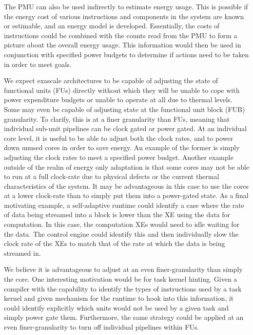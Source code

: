     The PMU can also be used indirectly to estimate energy usage. This is possible if the energy cost of various instructions and components in the system are known or estimable, and an energy model is developed. Essentially, the costs of instructions could be combined with the counts read from the PMU to form a picture about the overall energy usage. This information would then be used in conjunction with specified power budgets to determine if actions need to be taken in order to meet goals.
    

    We expect exascale architectures to be capable of adjusting the state of functional units (FUs) directly without which they will be unable to cope with power expenditure budgets or unable to operate at all due to thermal levels. Some may even be capable of adjusting state at the functional unit block (FUB) granularity. To clarify, this is at a finer granularity than FUs, meaning that individual sub-unit pipelines can be clock gated or power gated. At an individual core level, it is useful to be able to adjust both the clock rates, and to power down unused cores in order to save energy. An example of the former is simply adjusting the clock rates to meet a specified power budget. Another example outside of the realm of energy only adaptation is that some cores may not be able to run at a full clock-rate due to physical defects or the current thermal characteristics of the system. It may be advantageous in this case to use the cores at a lower clock-rate than to simply put them into a power-gated state. As a final motivating example, a self-adaptive runtime could identify a case where the rate of data being streamed into a block is lower than the XE using the data for computation. In this case, the computation XEs would need to idle waiting for the data. The control engine could identify this and then individually slow the clock rate of the XEs to match that of the rate at which the data is being streamed in.
    
    We believe it is advantageous to adjust at an even finer-granularity than simply the core. One interesting motivation would be for task kernel hinting. Given a compiler with the capability to identify the types of instructions used by a task kernel and given mechanism for the runtime to hook into this information, it could identify explicitly which units would not be used by a given task and simply power gate them. Furthermore, the same strategy could be applied at an even finer-granularity to turn off individual pipelines within FUs.

